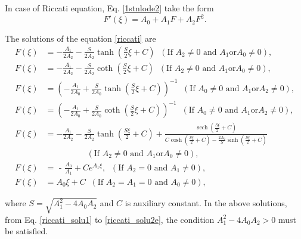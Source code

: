 \documentclass[prd,aps,floats,showkeys,nofootinbib,notitlepage]{revtex4-2}
\begin{document}
	In case of Riccati equation, Eq. \eqref{1stnlode2} take the form
	\begin{equation}\label{riccati}
		F'\left( \xi  \right) = {A_0} + {A_1}F + {A_2}{F^2}.
	\end{equation} 
	
	The solutions of the equation \eqref{riccati} are \cite{yang}
	\begin{subequations}\label{riccati_solu}
		\begin{align}
			\label{riccati_solu1}F\left( \xi  \right) &= - \frac{{{A_1}}}{{2{A_2}}} - \frac{S}{{2{A_2}}}\tanh \left( {\frac{S}{2}\xi  + C} \right) \;\;(\text{If } A_2 \neq 0 \text{ and } A_1 \text{or} A_0 \neq 0),\\
			F\left( \xi  \right) &= - \frac{{{A_1}}}{{2{A_2}}} - \frac{S}{{2{A_2}}}\coth \left( {\frac{S}{2}\xi  + C} \right) \;\;(\text{If } A_2 \neq 0 \text{ and } A_1 \text{or} A_0 \neq 0),\\
			F\left( \xi  \right) &= {\left( { - \frac{{{A_1}}}{{2{A_0}}} + \frac{S}{{2{A_0}}}\tanh \left( {\frac{S}{2}\xi  + C} \right)} \right)^{ - 1}} \;\;(\text{If }A_0 \neq 0 \text{ and } A_1 \text{or} A_2 \neq 0),\\
			F\left( \xi  \right) &= {\left( { - \frac{{{A_1}}}{{2{A_0}}} + \frac{S}{{2{A_0}}}\coth \left( {\frac{S}{2}\xi  + C} \right)} \right)^{ - 1}} \;\;(\text{If }A_0 \neq 0 \text{ and } A_1 \text{or} A_2 \neq 0),\\
			\label{riccati_solu2e}F\left( \xi  \right) &=  - \frac{{{A_1}}}{{2{A_2}}} - \frac{S }{{2{A_2}}}\tanh \left( {\frac{{S \xi }}{2}+C} \right) + \frac{{\operatorname{sech} \left( {\frac{{S \xi }}{2}+C} \right)}}{{{C}\cosh \left( {\frac{{S \xi }}{2}+C} \right) - \frac{{2{A_2}}}{S }\sinh \left( {\frac{{S \xi }}{2}+C} \right)}}\\
			& \,\,\,\,\,\,\,\,\,\,\,\,\,\,\,\,\,\,\,\,\,\,\,\,\,\,\,\,\,\,(\text{If } A_2 \neq 0 \text{ and } A_1 \text{or} A_0 \neq 0),\nonumber\\
			\label{riccati_soluA2f}F\left( \xi  \right) &= {\text{ - }}\frac{{{A_0}}}{{{A_1}}} + C{e^{ {{A_1}\xi }}},\;\; (\text{If } A_2=0 \text{ and } A_1\neq 0),\\
			F\left( \xi  \right) &= A_0\xi +C\;\;(\text{If }  A_2=A_1=0 \text{ and } A_0\neq 0 ),	
		\end{align}
	\end{subequations}
	
	where $S = \sqrt{A_1^2-4A_0A_2}$ and $C$ is auxiliary constant. In the above solutions, from Eq. \eqref{riccati_solu1} to \eqref{riccati_solu2e}, the condition $A_1^2-4A_0A_2>0$ must be satisfied. 
	
\end{document}
